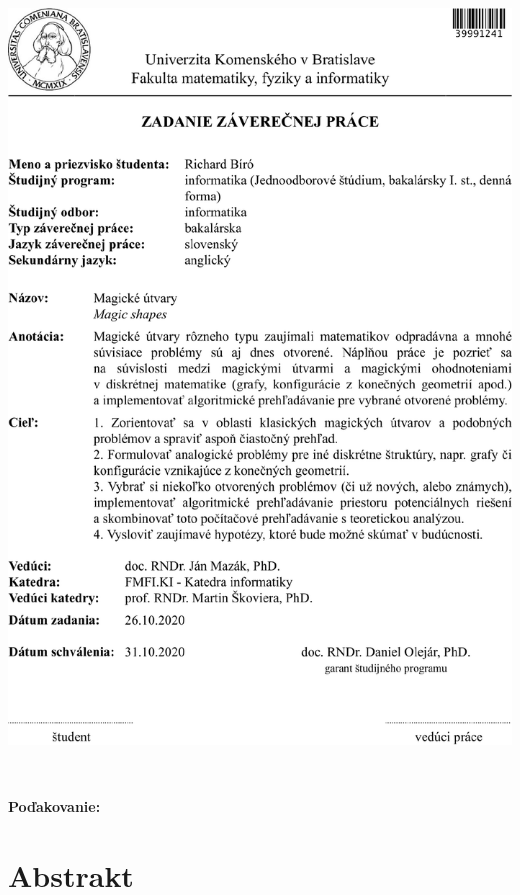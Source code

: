 \documentclass[12pt, twoside]{book}
\begin{document}
\newpage 
\thispagestyle{empty}
\hspace{-2cm}\includegraphics[width=1.1\textwidth]{images/zadanie}


\frontmatter

\setcounter{page}{3}
\newpage 
~

\vfill
{\bf Poďakovanie:} 


\newpage 
\section*{Abstrakt}
\end{document}
